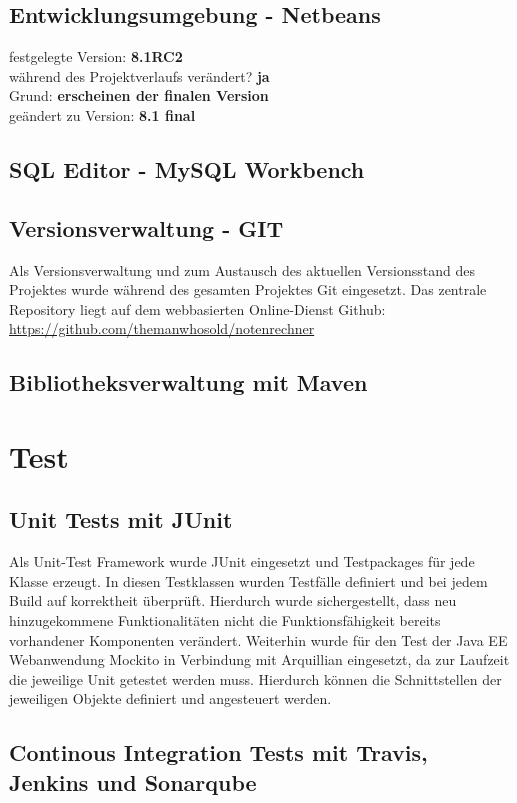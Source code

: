 \documentclass[12pt,a4paper,parskip]{scrreprt}
\begin{document}
\subsection{Entwicklungsumgebung - Netbeans}
festgelegte Version: \textbf{8.1RC2}\\
während des Projektverlaufs verändert? \textbf{ja}\\
Grund: \textbf{erscheinen der finalen Version} \\
geändert zu Version: \textbf{8.1 final}\\

\subsection{SQL Editor - MySQL Workbench}
\subsection{Versionsverwaltung - GIT}
Als Versionsverwaltung und zum Austausch des aktuellen Versionsstand des Projektes wurde während des gesamten Projektes Git eingesetzt. Das zentrale Repository liegt auf dem webbasierten Online-Dienst Github:
\url{https://github.com/themanwhosold/notenrechner}
\subsection{Bibliotheksverwaltung mit Maven}
\section{Test}
\subsection{Unit Tests mit JUnit}
Als Unit-Test Framework wurde JUnit eingesetzt und Testpackages für jede Klasse erzeugt. In diesen Testklassen wurden Testfälle definiert und bei jedem Build auf korrektheit überprüft. Hierdurch wurde sichergestellt, dass neu hinzugekommene Funktionalitäten nicht die Funktionsfähigkeit bereits vorhandener Komponenten verändert.
Weiterhin wurde für den Test der Java EE Webanwendung Mockito in Verbindung mit Arquillian eingesetzt, da zur Laufzeit die jeweilige Unit getestet werden muss. Hierdurch können die Schnittstellen der jeweiligen Objekte definiert und angesteuert werden.
\subsection{Continous Integration Tests mit Travis, Jenkins und Sonarqube}
\end{document}
